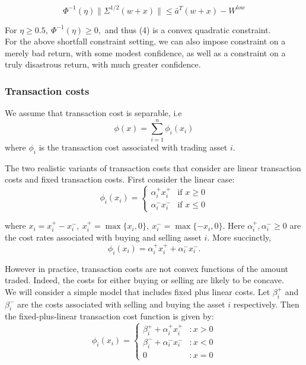 \documentclass[a4paper]{article}
\begin{document}
\begin{equation}
\Phi^{-1}(\eta)\|\Sigma^{1/2}(w+x)\| \leq \bar{a}^T(w+x)- W^{low}
\end{equation}

For $\eta \geq 0.5,\ \Phi^{-1}(\eta) \geq 0,$ and thus (4) is a convex quadratic constraint.\\

For the above shortfall constraint setting, we can also impose constraint on a merely
bad return, with some modest confidence, as well as a constraint on a truly disastrous return,
with much greater confidence.

\subsubsection{Transaction costs}

We assume that transaction cost is separable, i.e
$$
\phi(x) =\sum_{i=1}^n \phi_i(x_i)
$$
where $\phi_i$ is the transaction cost associated with trading asset $i$.

The two realistic variants of transaction costs that consider are linear transaction costs and fixed transaction costs. First consider the linear case:
\[
 \phi_i(x_i) =
  \begin{cases}
   \alpha_i^{+}x_i^+ & \text{if } x \geq 0 \\
   \alpha_i^{-}x_i^-       & \text{if } x \leq 0
  \end{cases}
\]

where $x_i = x_i^+ - x_i ^-,\ x_i^+ = \max\{x_i,0 \},\ x_i^- = \max\{-x_i,0\}$. Here $\alpha_i^+, \alpha_i^- \geq 0$ are the cost rates associated with buying and selling asset $i$. More succinctly, 
$$
\phi_i(x_i)= \alpha_i^{+}x_i^+ + \alpha_i^{-}x_i^-.
$$  

However in practice, transaction costs are not convex functions of the amount traded. Indeed, the
costs for either buying or selling are likely to be concave\cite{2}.\\
 We will consider a simple model that includes fixed
plus linear costs. Let $\beta_i^+$ and $\beta_i^-$ are the costs associated with selling and buying the asset $i$ respectively. Then the fixed-plus-linear transaction cost function is given by:
\[
 \phi_i(x_i) =
  \begin{cases}
   \beta_i^+ + \alpha_i^{+}x_i^+ &:  x > 0 \\
   \beta_i^- + \alpha_i^{-}x_i^-       &: x < 0\\
   0 &: x=0
  \end{cases}
\]
\end{document}
